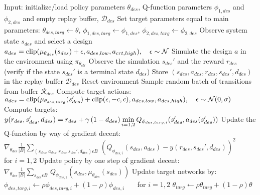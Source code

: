 \begin{algorithmic}[1]
    \State Input: initialize/load policy parameters $\theta_{des}$, Q-function parameters $\phi_{1,des}$ and $\phi_{2,des}$ and empty replay buffer, $\mathcal{D}_{des}$
    \State Set target parameters equal to main parameters: $\theta_{des,targ} \leftarrow \theta$, $\phi_{1,des,targ} \leftarrow \phi_{1,des}$, $\phi_{2,des,targ} \leftarrow \phi_{2,des}$
    \State Observe system state $s_{des}$ and select a design $a_{des} = \textup{clip}(\mu_{\theta_{des}}(s_{des}) + \epsilon, a_{des,low}, a_{crt,high}),~~~ \epsilon \sim \mathcal{N}$
    \State Simulate the design $a$ in the environment using $\pi_{\theta_{ctr}}$
    \State Observe the simulation $s_{des}'$ and the reward $r_{des}$ (verify if the state $s_{des}'$ is a terminal state $d_{des}$)
    \State Store $(s_{des}, a_{des}, r_{des}, s_{des}', d_{des})$ in the replay buffer $\mathcal{D}_{des}$
    \State Reset environment
    \EndIf
    \State Sample random batch of transitions from buffer $\mathcal{R}_{des}$
    \State Compute target actions: \newline \hspace*{5em} $a_{des} = \textup{clip}(\mu_{\theta_{des,targ}}(s_{des}') + \textup{clip}(\epsilon, -c, c), a_{des,low}, a_{des,high}),~~~ \epsilon \sim \mathcal{N}(0,\sigma)$
    \State Compute targets: \newline \hspace*{5em} $y(r_{des},s_{des}',d_{des}) = r_{des} + \gamma\,(1-d_{des})\, \underset{i=1,2}{\textup{min}}\, Q_{\phi_{des,targ,i}}(s_{des}', a_{des}(s_{des}'))$
    \State Update the Q-function by way of gradient decent: \newline \hspace*{5em} $\nabla_{\theta_{des}}\frac{1}{|B|}\sum_{(s_{des},a_{des},r_{des},s_{des}',d_{des}) \epsilon B} \, (Q_{\phi_{des,i}}(s_{des}, a_{des}) - y(r_{des},s_{des}',d_{des}))^2$~~~ for $i=1,2$
    \State Update policy by one step of gradient decent: \newline \hspace*{5em} $\nabla_{\theta_{des}}\frac{1}{|B|}\sum_{s_{des} \epsilon B} \, Q_{\phi_{des,1}}(s_{des}, \mu_{\theta_{des}}(s_{des}))$
    \State Update target networks by: \newline \hspace*{5em} $\phi_{des,targ,i} \leftarrow \rho \phi_{des,targ,i} + (1 - \rho)\phi_{des,i}$~~~ for $i=1,2$ \newline \hspace*{5em} $\theta_{targ} \leftarrow \rho \theta_{targ} + (1 - \rho)\theta$
    \EndIf
    \EndFor
    \EndIf
    \EndWhile


\end{algorithmic}
